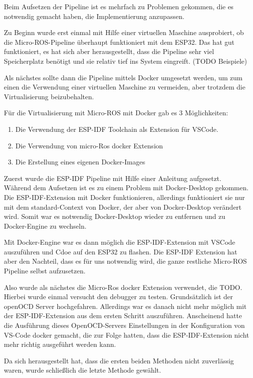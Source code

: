 \begin{flushleft}
    Beim Aufsetzen der Pipeline ist es mehrfach zu Problemen gekommen, die es notwendig gemacht haben, die Implementierung anzupassen.

    Zu Beginn wurde erst einmal mit Hilfe einer virtuellen Maschine ausprobiert, ob die Micro-ROS-Pipeline überhaupt funktioniert mit dem ESP32.
    Das hat gut funktioniert, es hat sich aber herausgestellt, dass die Pipeline sehr viel Speicherplatz benötigt und sie relativ tief ins System eingreift. (TODO Beispiele)
    
    Als nächstes sollte dann die Pipeline mittels Docker umgesetzt werden, um zum einen die Verwendung einer virtuellen Maschine zu vermeiden, aber trotzdem die Virtualisierung beizubehalten.

    Für die Virtualisierung mit Micro-ROS mit Docker gab es 3 Möglichkeiten:
    \begin{enumerate}
        \item Die Verwendung der ESP-IDF Toolchain als Extension für VSCode.
        \item Die Verwendung von micro-Ros docker Extension
        \item Die Erstellung eines eigenen Docker-Images
    \end{enumerate}

    Zuerst wurde die ESP-IDF Pipeline mit Hilfe einer Anleitung aufgesetzt. 
    Während dem Aufsetzen ist es zu einem Problem mit Docker-Desktop gekommen. Die ESP-IDF-Extension mit Docker funktionieren, allerdings funktioniert sie nur mit dem standard-Context von Docker, der aber von Docker-Desktop verändert wird.
    Somit war es notwendig Docker-Desktop wieder zu entfernen und zu Docker-Engine zu wechseln.

    Mit Docker-Engine war es dann möglich die ESP-IDF-Extension mit VSCode auszuführen und Cdoe auf den ESP32 zu flashen.
    Die ESP-IDF Extension hat aber den Nachteil, dass es für uns notwendig wird, die ganze restliche Micro-ROS Pipeline selbst aufzusetzen.

    Also wurde als nächstes die Micro-Ros docker Extension verwendet, die TODO.
    Hierbei wurde einmal versucht den debugger zu testen. Grundsätzlich ist der openOCD Server hochgefahren. Allerdings war es danach nicht mehr möglich mit der ESP-IDF-Extension aus dem ersten Schritt auszuführen. 
    Anscheinend hatte die Ausführung dieses OpenOCD-Servers Einstellungen in der Konfiguration von VS-Code docker gemacht, die zur Folge hatten, dass die ESP-IDF-Extension nicht mehr richtig ausgeführt werden kann.

    Da sich herausgestellt hat, dass die ersten beiden Methoden nicht zuverlässig waren, wurde schließlich die letzte Methode gewählt.
\end{flushleft}